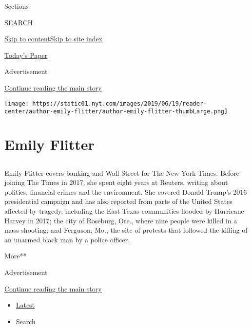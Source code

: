 Sections

SEARCH

\protect\hyperlink{site-content}{Skip to
content}\protect\hyperlink{site-index}{Skip to site index}

\href{https://myaccount.nytimes.com/auth/login?response_type=cookie\&client_id=vi}{}

\href{https://www.nytimes.com/section/todayspaper}{Today's Paper}

Advertisement

\protect\hyperlink{after-top}{Continue reading the main story}

\texttt{[image: https://static01.nyt.com/images/2019/06/19/reader-center/author-emily-flitter/author-emily-flitter-thumbLarge.png]}

\hypertarget{emily-flitter}{%
\section{Emily Flitter}\label{emily-flitter}}

\subsection{}

Emily Flitter covers banking and Wall Street for The New York Times.
Before joining The Times in 2017, she spent eight years at Reuters,
writing about politics, financial crimes and the environment. She
covered Donald Trump's 2016 presidential campaign and has also reported
from parts of the United States affected by tragedy, including the East
Texas communities flooded by Hurricane Harvey in 2017; the city of
Roseburg, Ore., where nine people were killed in a mass shooting; and
Ferguson, Mo., the site of protests that followed the killing of an
unarmed black man by a police officer.

More**

Advertisement

\protect\hyperlink{after-mid1}{Continue reading the main story}

\begin{itemize}
\tightlist
\item
  \protect\hyperlink{stream-panel}{Latest}
\item
  Search
\end{itemize}


